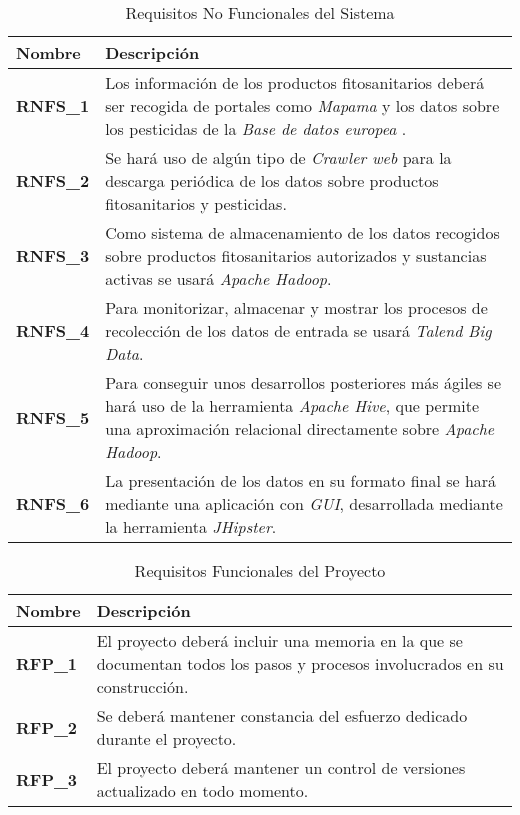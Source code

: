 \begin{table}[!h]
\centering
\bgroup
\def\arraystretch{1.3}
\begin{tabular}{l p{13cm}}
\toprule
\textbf{Nombre} & \textbf{Descripción} \\
 \midrule
\textbf{RNFS\_1} & 
Los información de los productos fitosanitarios deberá ser recogida de portales como \textit{Mapama} \cite{mapama} y los datos sobre los pesticidas de la \textit{Base de datos europea} \cite{pesticides_eu}.
 \\
\textbf{RNFS\_2} & 
Se hará uso de algún tipo de \textit{Crawler web} \cite{wikicrawler} para la descarga periódica de los datos sobre productos fitosanitarios y pesticidas.
 \\
\textbf{RNFS\_3} & 
Como sistema de almacenamiento de los datos recogidos sobre productos fitosanitarios autorizados y sustancias activas se usará \textit{Apache Hadoop}.
 \\
\textbf{RNFS\_4} & 
Para monitorizar, almacenar y mostrar los procesos de recolección de los datos de entrada se usará \textit{Talend Big Data}. 
 \\
\textbf{RNFS\_5} & 
Para conseguir unos desarrollos posteriores más ágiles se hará uso de la herramienta \textit{Apache Hive}, que permite una aproximación relacional directamente sobre \textit{Apache Hadoop}.
 \\
\textbf{RNFS\_6} & 
La presentación de los datos en su formato final se hará mediante una aplicación con \textit{GUI}, desarrollada mediante la herramienta \textit{JHipster}.
 \\
\bottomrule
\end{tabular}
\egroup
\caption{Requisitos No Funcionales del Sistema}
\label{tab:req_no_func_sist}
\end{table}

\pagebreak
\newpage
\begin{table}[!h]
\centering
\bgroup
\def\arraystretch{1.3}
\begin{tabular}{l p{13cm}}
\toprule
\textbf{Nombre} & \textbf{Descripción} \\
 \midrule
\textbf{RFP\_1} & 
El proyecto deberá incluir una memoria en la que se documentan todos los pasos y procesos involucrados en su construcción.
 \\
\textbf{RFP\_2} & 
Se deberá mantener constancia del esfuerzo dedicado durante el proyecto.
 \\
\textbf{RFP\_3} &
El proyecto deberá mantener un control de versiones actualizado en todo momento. 
 \\
\bottomrule
\end{tabular}
\egroup
\caption{Requisitos Funcionales del Proyecto}
\label{tab:req_func_proy}
\end{table}












 


















